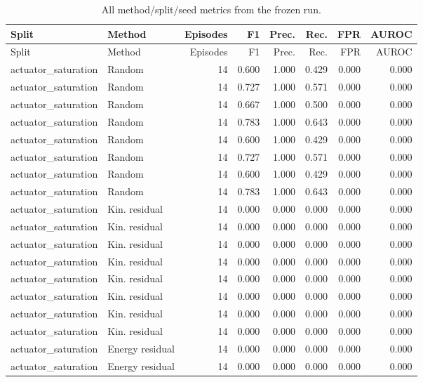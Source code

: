 {\scriptsize
\setlength{\tabcolsep}{2.5pt}
\begin{longtable}{llrrrrrr}
\caption{All method/split/seed metrics from the frozen run.}\label{tab:all-seed-metrics}\\
\toprule
Split & Method & Episodes & F1 & Prec. & Rec. & FPR & AUROC \\
\midrule
\endfirsthead
\toprule
Split & Method & Episodes & F1 & Prec. & Rec. & FPR & AUROC \\
\midrule
\endhead
actuator\_saturation & Random & 14 & 0.600 & 1.000 & 0.429 & 0.000 & 0.000 \\
actuator\_saturation & Random & 14 & 0.727 & 1.000 & 0.571 & 0.000 & 0.000 \\
actuator\_saturation & Random & 14 & 0.667 & 1.000 & 0.500 & 0.000 & 0.000 \\
actuator\_saturation & Random & 14 & 0.783 & 1.000 & 0.643 & 0.000 & 0.000 \\
actuator\_saturation & Random & 14 & 0.600 & 1.000 & 0.429 & 0.000 & 0.000 \\
actuator\_saturation & Random & 14 & 0.727 & 1.000 & 0.571 & 0.000 & 0.000 \\
actuator\_saturation & Random & 14 & 0.600 & 1.000 & 0.429 & 0.000 & 0.000 \\
actuator\_saturation & Random & 14 & 0.783 & 1.000 & 0.643 & 0.000 & 0.000 \\
actuator\_saturation & Kin. residual & 14 & 0.000 & 0.000 & 0.000 & 0.000 & 0.000 \\
actuator\_saturation & Kin. residual & 14 & 0.000 & 0.000 & 0.000 & 0.000 & 0.000 \\
actuator\_saturation & Kin. residual & 14 & 0.000 & 0.000 & 0.000 & 0.000 & 0.000 \\
actuator\_saturation & Kin. residual & 14 & 0.000 & 0.000 & 0.000 & 0.000 & 0.000 \\
actuator\_saturation & Kin. residual & 14 & 0.000 & 0.000 & 0.000 & 0.000 & 0.000 \\
actuator\_saturation & Kin. residual & 14 & 0.000 & 0.000 & 0.000 & 0.000 & 0.000 \\
actuator\_saturation & Kin. residual & 14 & 0.000 & 0.000 & 0.000 & 0.000 & 0.000 \\
actuator\_saturation & Kin. residual & 14 & 0.000 & 0.000 & 0.000 & 0.000 & 0.000 \\
actuator\_saturation & Energy residual & 14 & 0.000 & 0.000 & 0.000 & 0.000 & 0.000 \\
actuator\_saturation & Energy residual & 14 & 0.000 & 0.000 & 0.000 & 0.000 & 0.000 \\

\end{longtable}}
